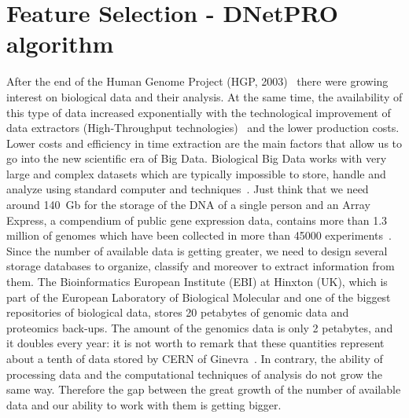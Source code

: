 \documentclass{standalone}
\begin{document}
\chapter[Feature Selection]{Feature Selection - DNetPRO algorithm}\label{chapter1:featsel}



After the end of the Human Genome Project (HGP, 2003)~\cite{McKinney2012} there were growing interest on biological data and their analysis.
At the same time, the availability of this type of data  increased exponentially with the technological improvement of data extractors (High-Throughput technologies)~\cite{Reuter2015} and the lower production costs.
Lower costs and efficiency in time extraction are the main factors that allow us to go into the new scientific era of Big Data.
Biological Big Data works with very large and complex datasets which are typically impossible to store, handle and analyze using standard computer and techniques~\cite{Kumari2014}.
Just think that we need around 140~Gb for the storage of the DNA of a single person and an Array Express, a compendium of public gene expression data, contains more than 1.3 million of genomes which have been collected in more than 45000 experiments~\cite{Greene2014}.
Since the number of available data is getting greater, we need to design several storage databases to organize, classify and moreover to extract information from them.
The Bioinformatics European Institute (EBI) at Hinxton (UK), which is part of the European Laboratory of Biological Molecular and one of the biggest repositories of biological data, stores 20 petabytes of genomic data and proteomics back-ups.
The amount of the genomics data is only 2 petabytes, and it doubles every year: it is not worth to remark that these quantities represent about a tenth of data stored by CERN of Ginevra~\cite{Marx2013}.
In contrary, the ability of processing data and the computational techniques of analysis do not grow the same way.
Therefore the gap between the great growth of the number of available data and our ability to work with them is getting bigger.
\end{document}
